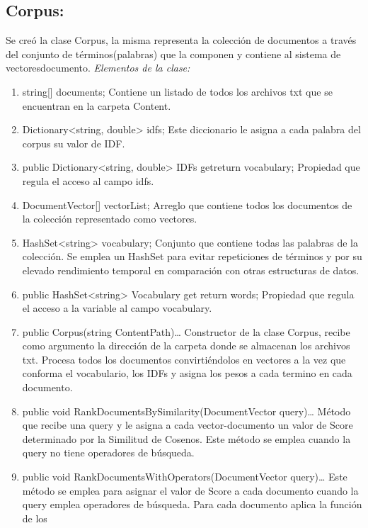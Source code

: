 \documentclass[a4paper,12pt,twocolumn]{article}
\begin{document}
\subsection{Corpus:}
 Se creó la clase Corpus, la misma representa la colección de documentos a través
del conjunto de términos(palabras) que la componen y contiene al sistema de vectoresdocumento.
\emph{Elementos de la clase:}
\begin{enumerate}
     
    \item string[] documents;
        Contiene un listado de todos los archivos txt que se encuentran en la carpeta Content.
    \item Dictionary<string, double> idfs;
        Este diccionario le asigna a cada palabra del corpus su valor de IDF.
    \item public Dictionary<string, double> IDFs { get{return vocabulary;}}
        Propiedad que regula el acceso al campo idfs.
    \item DocumentVector[] vectorList;
        Arreglo que contiene todos los documentos de la colección representado como vectores.
    \item HashSet<string> vocabulary;
        Conjunto que contiene todas las palabras de la colección. Se emplea un HashSet para
        evitar repeticiones de términos y por su elevado rendimiento temporal en comparación
        con otras estructuras de datos.
    \item public HashSet<string> Vocabulary { get{ return words;}}
        Propiedad que regula el acceso a la variable al campo vocabulary.
    \item public Corpus(string ContentPath){…}
        Constructor de la clase Corpus, recibe como argumento la dirección de la carpeta donde
        se almacenan los archivos txt. Procesa todos los documentos convirtiéndolos en vectores
        a la vez que conforma el vocabulario, los IDFs y asigna los pesos a cada termino en cada
        documento.
    \item public void RankDocumentsBySimilarity(DocumentVector query){…}
        Método que recibe una query y le asigna a cada vector-documento un valor de Score
        determinado por la Similitud de Cosenos. Este método se emplea cuando la query no
        tiene operadores de búsqueda.
    \item public void RankDocumentsWithOperators(DocumentVector query){…}
        Este método se emplea para asignar el valor de Score a cada documento cuando la
        query emplea operadores de búsqueda. Para cada documento aplica la función de los

\end{enumerate}
\end{document}
